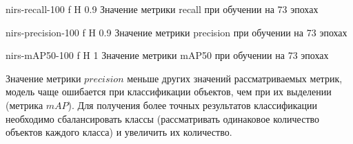 {nirs-recall-100} %
{f} %
{H} %
{0.9\textwidth} %
{Значение метрики recall при обучении на 73 эпохах} %


{nirs-precision-100} %
{f} %
{H} %
{0.9\textwidth} %
{Значение метрики precision при обучении на 73 эпохах} %


{nirs-mAP50-100} %
{f} %
{H} %
{1\textwidth} %
{Значение метрики mAP50 при обучении на 73 эпохах} %

Значение метрики $precision$  меньше других значений рассматриваемых метрик, модель чаще ошибается при классификации объектов, чем при их выделении (метрика $mAP$).
Для получения более точных результатов  классификации необходимо сбалансировать классы (рассматривать  одинаковое количество объектов каждого класса) и
увеличить их количество.




